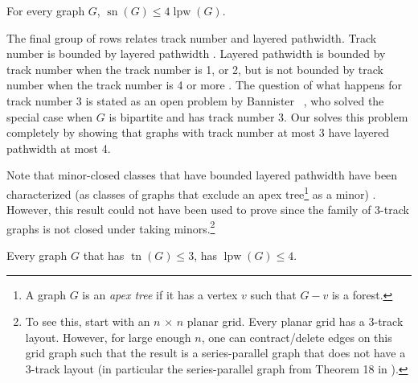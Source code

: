\documentclass{patmorin}
\DeclareMathOperator{\sn}{sn}
\DeclareMathOperator{\tr}{tn}
\DeclareMathOperator{\lpw}{lpw}
\begin{document}
\begin{thm}
 For every graph $G$, $\sn(G)\le 4 \lpw(G)$.
\end{thm}

The final group of rows relates track number and layered pathwidth.  Track number is bounded by layered pathwidth \cite{bannister2018track}.  Layered pathwidth is bounded by track number when the track number is 1, or 2, but is not bounded by track number when the track number is 4 or more \cite{bannister2018track}.  The question of what happens for track number 3 is stated as an open problem by Bannister \etal\ \cite{bannister2018track}, who solved the special case when $G$ is bipartite and has track number 3.  Our  solves this problem completely by showing that graphs with track number at most 3 have layered pathwidth at most 4.

Note that minor-closed classes that have bounded layered pathwidth have been characterized (as classes of graphs that exclude an apex tree\footnote{A graph $G$ is an {\em apex tree} if it has a vertex $v$ such that $G-v$ is a forest. } as a minor) \cite{DBLP:journals/corr/abs-1810-08314}. However, this result could not have been used to prove  since the family of 3-track graphs is not closed under taking minors.\footnote{To see this, start with an $ n\, \times\, n$ planar grid. Every planar grid has a 3-track layout. However, for large enough $n$, one can contract/delete edges on this grid graph such that the result is a series-parallel graph that does not have a 3-track layout (in particular the series-parallel graph from Theorem 18 in \cite{bannister2018track}).}

\begin{thm}
 Every graph $G$ that has $\tr(G)\le 3$, has $\lpw(G)\le 4$.
\end{thm}






%
%
%
%
%
%
%
\end{document}
